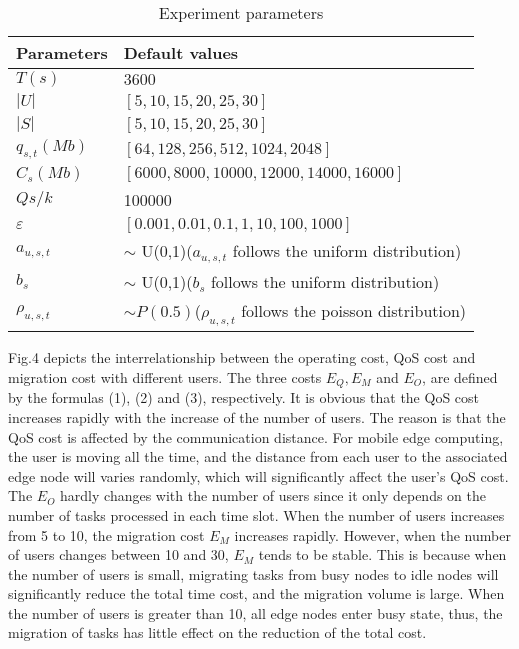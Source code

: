 \documentclass[journal,article,submit,pdftex,moreauthors]{Definitions/mdpi}
\begin{document}
\begin{table}[h] %
 \footnotesize
\caption{Experiment parameters} %
\begin{tabular}{p{2cm}p{6cm}} %

\hline
Parameters&Default values  \\ %



\hline %
$T(s)$ &$3600$\\

$|U|$&$[5,10,15,20,25,30]$\\
$|S|$&$[5,10,15,20,25,30]$\\
$q_{s,t}(Mb)$&$[64,128,256,512,1024,2048]$\\
$C_s(Mb)$&$[6000,8000,10000,12000,14000,16000]$\\
$Qs/k$ & 100000\\
$\varepsilon$&$[0.001,0.01,0.1,1,10,100,1000]$\\
$a_{u,s,t}$&$\sim$ U(0,1)\quad ($a_{u,s,t}$ follows the  uniform distribution)\\
$b_s$&$\sim$ U(0,1)\quad ($b_s$ follows the  uniform distribution)\\
$\rho_{u,s,t}$&$\sim P(0.5)$\quad($\rho_{u,s,t}$ follows the  poisson distribution)\\
\hline
\end{tabular}
\end{table}

Fig.4 depicts the interrelationship between the operating cost, QoS cost and migration cost with different users.  The three costs $E_Q,E_M$ and $E_O$, are defined by the formulas (1), (2) and (3),  respectively. It is obvious that the QoS cost increases rapidly with the increase of the number of users. The reason is that the QoS cost is affected by the communication distance. For mobile edge computing, the user is moving all the time, and the distance from each user to the associated  edge node  will varies randomly, which will significantly affect the user's QoS cost. The $E_O$  hardly changes with the number of users since it only depends on the number of tasks processed in each time slot. When the number of users increases from 5 to 10, the migration cost $E_M$ increases rapidly.  However, when the number of users changes between 10 and 30, $E_M$  tends to be stable. This is because when the number of users is small, migrating tasks from busy nodes to idle nodes will significantly reduce the total time cost, and the migration volume is large. When the number of users is greater than 10, all edge nodes enter busy state, thus, the migration of tasks has little effect on the reduction of the total cost. 
\end{document}
